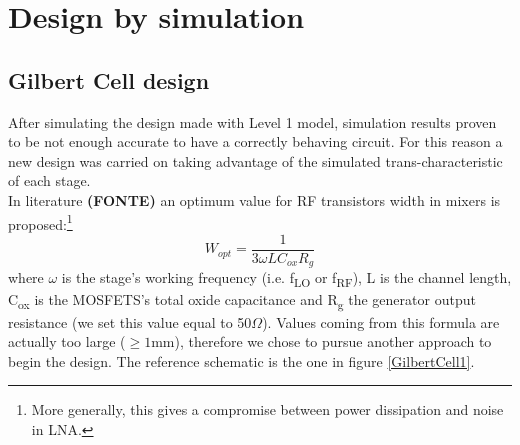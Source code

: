 \section{Design by simulation}

\subsection{Gilbert Cell design}
After simulating the design made with Level 1 model, simulation results proven to be not enough accurate to have a correctly behaving circuit.
For this reason a new design was carried on taking advantage of the simulated trans-characteristic of each stage.\\
In literature \textbf{(FONTE)} an optimum value for RF transistors width in mixers is proposed:\footnote{More generally, this gives a compromise between power dissipation and noise in LNA.}
\begin{equation}
W_{opt}=\frac{1}{3\omega L C_{ox} R_{g}}
\end{equation}
where $\omega$ is the stage's working frequency (i.e. f\textsubscript{LO} or f\textsubscript{RF}), L is the channel length, C\textsubscript{ox} is the MOSFETS's total oxide capacitance and R\textsubscript{g} the generator output resistance (we set this value equal to 50$\Omega$). Values coming from this formula are actually too large ($\ge1$mm), therefore we chose to pursue another approach to begin the design.
The reference schematic is the one in figure \ref{GilbertCell1}.
